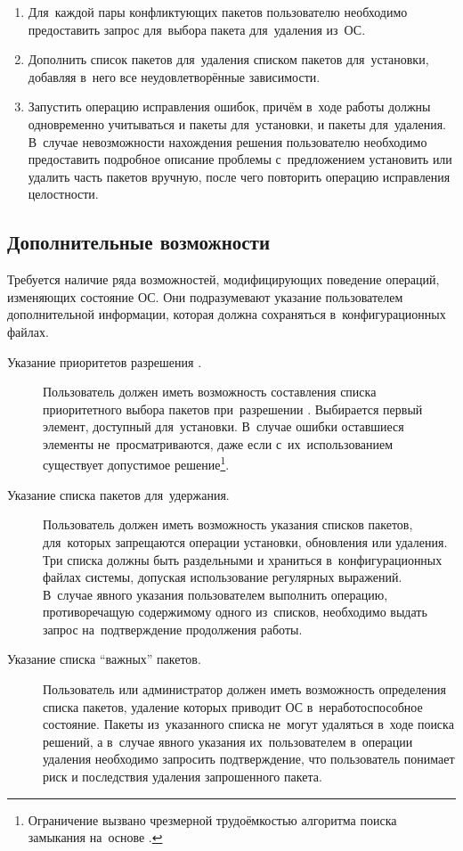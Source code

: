 \begin{enumerate}

\item {
Для~каждой пары конфликтующих пакетов пользователю необходимо предоставить запрос для~выбора пакета для~удаления из~ОС.
}

\item {
Дополнить список пакетов для~удаления списком пакетов для~установки,
добавляя в~него все неудовлетворённые зависимости.
}

\item {
Запустить операцию  исправления ошибок, 
причём в~ходе работы должны одновременно учитываться и пакеты для~установки, и пакеты для~удаления.
В~случае невозможности нахождения решения пользователю необходимо предоставить подробное описание проблемы с~предложением установить или удалить часть пакетов вручную,
после чего повторить операцию исправления целостности.
}

\end{enumerate}

\subsection{Дополнительные возможности}
\label{advfeatures}

Требуется наличие ряда возможностей, модифицирующих поведение операций, изменяющих состояние ОС.
Они подразумевают указание пользователем дополнительной информации,
которая должна сохраняться в~конфигурационных файлах. 

\begin{description}

\item[Указание приоритетов разрешения .]
Пользователь должен иметь возможность составления списка приоритетного выбора пакетов при~разрешении .
Выбирается первый элемент, доступный для~установки.
В~случае ошибки оставшиеся элементы не~просматриваются,
даже если с~их~использованием существует допустимое решение\footnote{
Ограничение вызвано чрезмерной трудоёмкостью алгоритма поиска замыкания на~основе .
}.

\item[Указание списка пакетов для~удержания.]
Пользователь должен иметь возможность указания списков пакетов,
для~которых запрещаются операции установки, обновления или удаления.
Три списка должны быть раздельными и храниться в~конфигурационных файлах системы, 
допуская использование регулярных выражений.
В~случае явного указания пользователем выполнить операцию, противоречащую содержимому одного из~списков, необходимо выдать запрос на~подтверждение продолжения работы. 

\item[Указание списка ``важных'' пакетов.]
Пользователь или администратор должен иметь возможность определения списка пакетов, 
удаление которых приводит ОС в~неработоспособное состояние.
Пакеты из~указанного списка не~могут удаляться в~ходе поиска решений, а в~случае явного указания их~пользователем в~операции удаления
необходимо запросить подтверждение, что пользователь понимает риск и последствия удаления запрошенного пакета.

\end{description}

